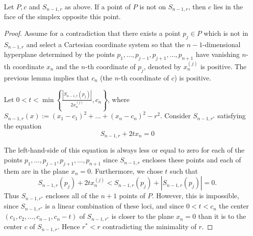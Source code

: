 \begin{centering}

\end{centering}

\begin{lemma}\label{blumenthal-property2}
	Let $P,c$ and $S_{n-1,r}$ as above. If a point of $P$ is not on $S_{n-1,r}$, then $c$ lies in the face of the simplex opposite this point.
\end{lemma}

\begin{proof}%
	Assume for a contradiction that there exists a point $p_j\in P$ which is not in $S_{n-1,r}$ and select a Cartesian coordinate system so that the $n-1$-dimensional hyperplane determined by the points $p_1,\dots, p_{j-1},p_{j+1},\dots, p_{n+1}$ have vanishing $n$-th coordinate $x_n$ and the $n$-th coordinate of $p_j$, denoted by $x_n^{(j)}$ is positive. The previous lemma implies that $c_n$ (the $n$-th coordinate of $c$) is positive.
	
	Let $0<t<\min\left\{\frac{|S_{n-1,r}(p_j)|}{2x_n^{(j)}},c_n\right\}$, where $S_{n-1,r}(x):={(x_1-c_1)^2+\dots+(x_n-c_n)^2}-r^2$. Consider $S_{n-1,r^\ast}$ satisfying the equation
	\[
	S_{n-1,r}+2tx_n=0
	\]
	
	The left-hand-side of this equation is always less or equal to zero for each of the points $p_1,\dots,p_{j-1},p_{j+1},\dots,p_{n+1}$ since $S_{n-1,r}$ encloses these points and each of them are in the plane $x_n=0$. Furthermore, we chose $t$ such that
	\[
	S_{n-1,r}(p_j)+2tx_n^{(j)}<S_{n-1,r}(p_j)+|S_{n-1,r}(p_j)|=0.
	\]
	Thus $S_{n-1,r^\ast}$ encloses all of the $n+1$ points of $P$. However, this is impossible, since $S_{n-1,r^\ast}$ is a linear combination of these loci, 
	and since $0<t<c_n$ the center $(c_1,c_2,\dots,c_{n-1},c_n-t)$ of $S_{n-1,r^\ast}$ is closer to the plane $x_n=0$ than it is to the center $c$ of $S_{n-1,r}$. Hence $r^\ast<r$ contradicting the minimality of $r$.
\end{proof}

